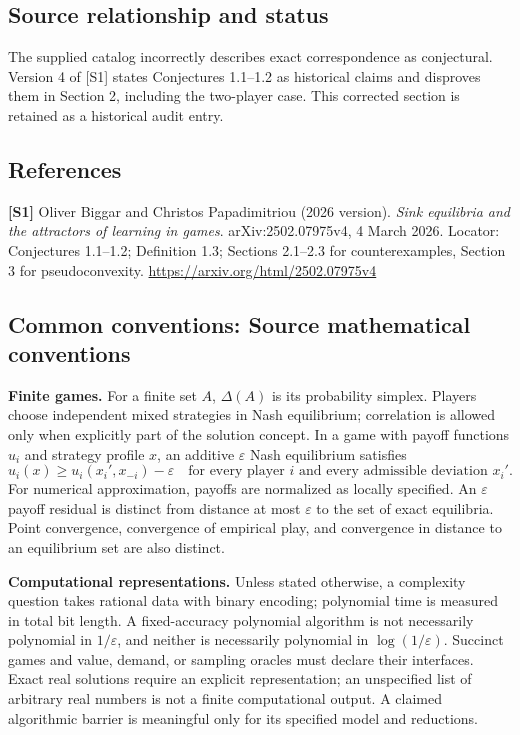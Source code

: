 \documentclass[11pt,a4paper]{article}
\begin{document}
\subsection*{Source relationship and status}
The supplied catalog incorrectly describes exact correspondence as conjectural. Version 4 of [S1] states Conjectures 1.1--1.2 as historical claims and disproves them in Section 2, including the two-player case. This corrected section is retained as a historical audit entry.
\subsection*{References}
\begingroup\footnotesize\raggedright
{\footnotesize\raggedright
\textbf{[S1]} Oliver Biggar and Christos Papadimitriou (2026 version). \emph{Sink equilibria and the attractors of learning in games}. arXiv:2502.07975v4, 4 March 2026. Locator: Conjectures 1.1--1.2; Definition 1.3; Sections 2.1--2.3 for counterexamples, Section 3 for pseudoconvexity. \url{https://arxiv.org/html/2502.07975v4}\par}
\par\endgroup

\subsection*{Common conventions: Source mathematical conventions}

\textbf{Finite games.} For a finite set $A$, $\Delta(A)$ is its probability
simplex. Players choose independent mixed strategies in Nash equilibrium;
correlation is allowed only when explicitly part of the solution concept.
In a game with payoff functions $u_i$ and strategy profile $x$, an additive
$\varepsilon$ Nash equilibrium satisfies
\[
 u_i(x)\geq u_i(x_i',x_{-i})-\varepsilon
 \quad\text{for every player $i$ and every admissible deviation $x_i'$}.
\]
For numerical approximation, payoffs are normalized as locally specified.
An $\varepsilon$ payoff residual is distinct from distance at most
$\varepsilon$ to the set of exact equilibria. Point convergence, convergence
of empirical play, and convergence in distance to an equilibrium set are
also distinct.

\textbf{Computational representations.} Unless stated otherwise, a complexity
question takes rational data with binary encoding; polynomial time is measured
in total bit length. A fixed-accuracy polynomial algorithm is not necessarily
polynomial in $1/\varepsilon$, and neither is necessarily polynomial in
$\log(1/\varepsilon)$. Succinct games and value, demand, or sampling oracles
must declare their interfaces. Exact real solutions require an explicit
representation; an unspecified list of arbitrary real numbers is not a
finite computational output. A claimed algorithmic barrier is meaningful
only for its specified model and reductions.
\end{document}
